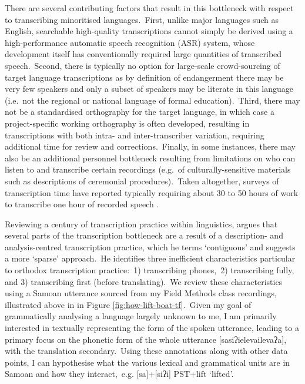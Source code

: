 \documentclass[main.tex]{subfiles}
\begin{document}
There are several contributing factors that result in this bottleneck with respect to transcribing minoritised languages.~First, unlike major languages such as English, searchable high-quality transcriptions cannot simply be derived using a high-performance automatic speech recognition (ASR) system, whose development itself has conventionally required large quantities of transcribed speech.~Second, there is typically no option for large-scale crowd-sourcing of target language transcriptions as by definition of endangerment there may be very few speakers and only a subset of speakers may be literate in this language (i.e.~not the regional or national language of formal education).~Third, there may not be a standardised orthography for the target language, in which case a project-specific working orthography is often developed, resulting in transcriptions with both intra- and inter-transcriber variation, requiring additional time for review and corrections.~Finally, in some instances, there may also be an additional personnel bottleneck resulting from limitations on who can listen to and transcribe certain recordings (e.g.~of culturally-sensitive materials such as descriptions of ceremonial procedures).~Taken altogether, surveys of transcription time have reported typically requiring about 30 to 50 hours of work to transcribe one hour of recorded speech \parencite{durantin2017survey,michaud2014towards,zahrer2020towards}.

Reviewing a century of transcription practice within linguistics, \textcite{bird-2020-sparse} argues that several parts of the transcription bottleneck are a result of a description- and analysis-centred transcription practice, which he terms `contiguous' and suggests a more `sparse' approach.~He identifies three inefficient characteristics particular to orthodox transcription practice:~1) transcribing phones,~2) transcribing fully, and 3) transcribing first (before translating).~We review these characteristics using a Samoan utterance sourced from my Field Methods class recordings, illustrated above in in Figure \ref{fig:how-lift-boat-tf}.~Given my goal of grammatically analysing a language largely unknown to me, I am primarily interested in textually representing the form of the spoken utterance, leading to a primary focus on the phonetic form of the whole utterance [{sasiʔielevailevaʔa}], with the translation secondary.~Using these annotations along with other data points, I can hypothesise what the various lexical and grammatical units are in Samoan and how they interact,~e.g. [sa]+[siʔi] P{\footnotesize{}ST}+lift `lifted'.
\end{document}
